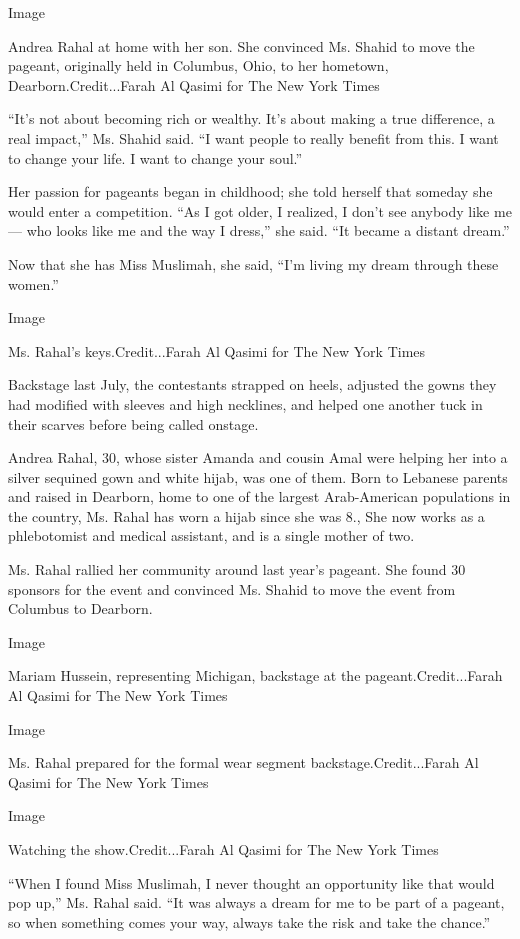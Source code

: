 Image

Andrea Rahal at home with her son. She convinced Ms. Shahid to move the
pageant, originally held in Columbus, Ohio, to her hometown,
Dearborn.Credit...Farah Al Qasimi for The New York Times

``It's not about becoming rich or wealthy. It's about making a true
difference, a real impact,'' Ms. Shahid said. ``I want people to really
benefit from this. I want to change your life. I want to change your
soul.''

Her passion for pageants began in childhood; she told herself that
someday she would enter a competition. ``As I got older, I realized, I
don't see anybody like me --- who looks like me and the way I dress,''
she said. ``It became a distant dream.''

Now that she has Miss Muslimah, she said, ``I'm living my dream through
these women.''

Image

Ms. Rahal's keys.Credit...Farah Al Qasimi for The New York Times

Backstage last July, the contestants strapped on heels, adjusted the
gowns they had modified with sleeves and high necklines, and helped one
another tuck in their scarves before being called onstage.

Andrea Rahal, 30, whose sister Amanda and cousin Amal were helping her
into a silver sequined gown and white hijab, was one of them. Born to
Lebanese parents and raised in Dearborn, home to one of the largest
Arab-American populations in the country, Ms. Rahal has worn a hijab
since she was 8., She now works as a phlebotomist and medical assistant,
and is a single mother of two.

Ms. Rahal rallied her community around last year's pageant. She found 30
sponsors for the event and convinced Ms. Shahid to move the event from
Columbus to Dearborn.

Image

Mariam Hussein, representing Michigan, backstage at the
pageant.Credit...Farah Al Qasimi for The New York Times

Image

Ms. Rahal prepared for the formal wear segment backstage.Credit...Farah
Al Qasimi for The New York Times

Image

Watching the show.Credit...Farah Al Qasimi for The New York Times

``When I found Miss Muslimah, I never thought an opportunity like that
would pop up,'' Ms. Rahal said. ``It was always a dream for me to be
part of a pageant, so when something comes your way, always take the
risk and take the chance.''

